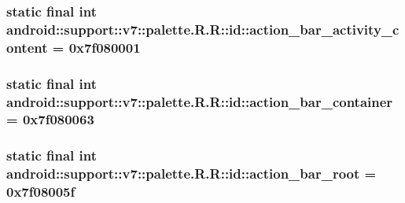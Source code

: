 \hypertarget{classandroid_1_1support_1_1v7_1_1palette_1_1_r_1_1id_38973502df082949c9721beb0e9618c6}{
\subsubsection[{action\_\-bar\_\-activity\_\-content}]{\setlength{\rightskip}{0pt plus 5cm}static final int android::support::v7::palette.R.R::id::action\_\-bar\_\-activity\_\-content = 0x7f080001}}
\label{classandroid_1_1support_1_1v7_1_1palette_1_1_r_1_1id_38973502df082949c9721beb0e9618c6}


\hypertarget{classandroid_1_1support_1_1v7_1_1palette_1_1_r_1_1id_2b1100dc07132a05fdb6d63c568a14fb}{
\subsubsection[{action\_\-bar\_\-container}]{\setlength{\rightskip}{0pt plus 5cm}static final int android::support::v7::palette.R.R::id::action\_\-bar\_\-container = 0x7f080063}}
\label{classandroid_1_1support_1_1v7_1_1palette_1_1_r_1_1id_2b1100dc07132a05fdb6d63c568a14fb}


\hypertarget{classandroid_1_1support_1_1v7_1_1palette_1_1_r_1_1id_0b712efc5457f1ceea82a4c726c3e407}{
\subsubsection[{action\_\-bar\_\-root}]{\setlength{\rightskip}{0pt plus 5cm}static final int android::support::v7::palette.R.R::id::action\_\-bar\_\-root = 0x7f08005f}}
\label{classandroid_1_1support_1_1v7_1_1palette_1_1_r_1_1id_0b712efc5457f1ceea82a4c726c3e407}


